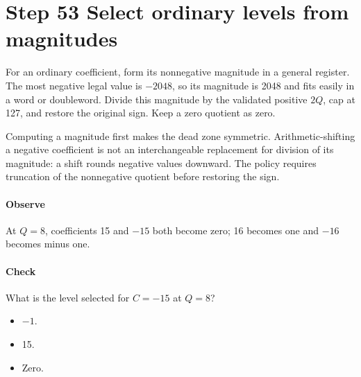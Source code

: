 \section{Step 53 Select ordinary levels from magnitudes}\label{h263-quant-s03}
For an ordinary coefficient, form its nonnegative magnitude in a general register.
The most negative legal value is $-2048$, so its magnitude is 2048 and fits easily
in a word or doubleword. Divide this magnitude by the validated positive $2Q$,
cap at 127, and restore the original sign. Keep a zero quotient as zero.

Computing a magnitude first makes the dead zone symmetric. Arithmetic-shifting a
negative coefficient is not an interchangeable replacement for division of its
magnitude: a shift rounds negative values downward. The policy requires truncation
of the nonnegative quotient before restoring the sign.

\paragraph{Observe} At $Q=8$, coefficients 15 and $-15$ both become zero;
16 becomes one and $-16$ becomes minus one.
\paragraph{Check} What is the level selected for $C=-15$ at $Q=8$?
\begin{itemize}
  \item[A.] $-1$.
  \item[B.] 15.
  \item[C.] Zero.
\end{itemize}

